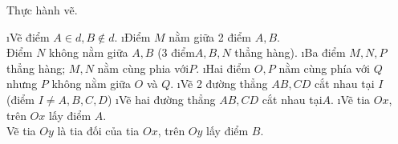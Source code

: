 \begin{vd}
	Thực hành vẽ.
	\begin{enumerate}[a),leftmargin=*]
		\i Vẽ điểm $A\in d,B\notin d.$
		\i Điểm $M$ nằm giữa 2 điểm $A,B$.\\
		Điểm $N$ không nằm giữa $A,B$ (3 điểm$ A,B,N$ thẳng hàng).
		\i Ba điểm $M,N,P$ thẳng hàng; $M,N$ nằm cùng phia với$P$.
		\i Hai điểm $O,P$ nằm cùng phía với $Q$ nhưng $P$ không nằm giữa $O$ và $Q$.
		\i Vẽ 2 đường thẳng $AB,CD$ cắt nhau tại $I $(điểm $I\ne A,B,C,D$)
		\i Vẽ hai đường thẳng $AB,CD$ cắt nhau tại$A$.
		\i Vẽ tia $Ox$, trên $Ox$ lấy điểm $A$.\\
		Vẽ tia $Oy$ là tia đối của tia $Ox$, trên $Oy$ lấy điểm $B$. 
	\end{enumerate}   
\end{vd}

